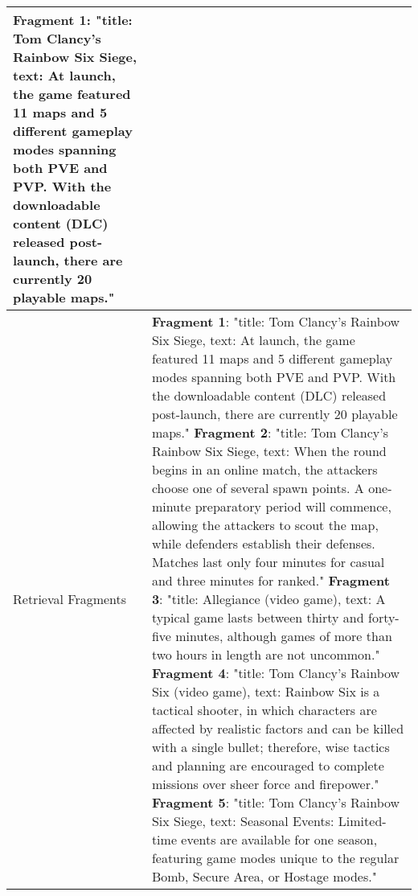 \begin{table}[htbp]
\begin{tabular}{l p{}}
\textbf{Fragment 1}: "title: Tom Clancy's Rainbow Six Siege, text: At launch, the game featured 11 maps and 5 different gameplay modes spanning both PVE and PVP. With the downloadable content (DLC) released post-launch, there are currently 20 playable maps." \\
\hline
Retrieval Fragments & \textbf{Fragment 1}: "title: Tom Clancy's Rainbow Six Siege, text: At launch, the game featured 11 maps and 5 different gameplay modes spanning both PVE and PVP. With the downloadable content (DLC) released post-launch, there are currently 20 playable maps." \newline\newline
\textbf{Fragment 2}: "title: Tom Clancy's Rainbow Six Siege, text: When the round begins in an online match, the attackers choose one of several spawn points. A one-minute preparatory period will commence, allowing the attackers to scout the map, while defenders establish their defenses. Matches last only four minutes for casual and three minutes for ranked." \newline\newline
\textbf{Fragment 3}: "title: Allegiance (video game), text: A typical game lasts between thirty and forty-five minutes, although games of more than two hours in length are not uncommon." \newline\newline
\textbf{Fragment 4}: "title: Tom Clancy's Rainbow Six (video game), text: Rainbow Six is a tactical shooter, in which characters are affected by realistic factors and can be killed with a single bullet; therefore, wise tactics and planning are encouraged to complete missions over sheer force and firepower." \newline\newline
\textbf{Fragment 5}: "title: Tom Clancy's Rainbow Six Siege, text: Seasonal Events: Limited-time events are available for one season, featuring game modes unique to the regular Bomb, Secure Area, or Hostage modes." \\

\hline
\end{tabular}
\end{table}

\clearpage

